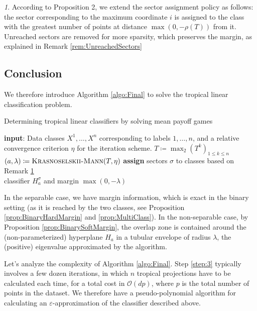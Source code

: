 \documentclass[oneside,UKenglish,a4paper]{amsart}
\numberwithin{equation}{section}
\numberwithin{figure}{section}
\theoremstyle{plain}
\theoremstyle{definition}
\theoremstyle{plain}
\theoremstyle{remark}
\newtheorem{rem}[thm]{\protect\remarkname}
\theoremstyle{plain}
\theoremstyle{definition}
\theoremstyle{definition}
\providecommand{\remarkname}{Remark}
\newcommand{\Input}{\textbf{input}}
\begin{document}
\begin{rem}\label{rem:SectorAssign}
According to Proposition 2, we extend the sector assignment policy as follows: the sector corresponding to the maximum coordinate $i$ is assigned to the class with the greatest number of points at distance $\max(0,-\rho(T))$ from it. Unreached sectors are removed for more sparsity, which preserves the margin, as explained in Remark \ref{rem:UnreachedSectors}
\end{rem}

\subsection*{Conclusion}

We therefore introduce Algorithm \ref{algo:Final} to solve the tropical linear classification problem.

\begin{algorithm}[h!]
\caption{Determining tropical linear classifiers by solving mean payoff games}
\label{algo:Final}
\begin{algorithmic}[1]
  \State \Input: Data classes $X^1,\ldots, X^n$ corresponding to labels $1, \ldots, n$, and a relative convergence criterion $\eta$ for the iteration scheme.
\State $T\coloneqq\max_2 \left(T^k\right)_{1\le k \le n}$
\State $(a,\lambda) \coloneqq \textsc{Krasnoselskii-Mann}(T, \eta)$ \label{step:3}
\State \textbf{assign} sectors $\sigma$ to classes based on Remark \ref{rem:SectorAssign}\\
\Return classifier $H_a^\sigma$ and margin $\max(0, -\lambda)$
\end{algorithmic}
\end{algorithm}

In the separable case, we have margin information, which is exact in the binary setting (as it is reached by the two classes, see Proposition \ref{prop:BinaryHardMargin} and \ref{prop:MultiClass}). In the non-separable case, by Proposition \ref{prop:BinarySoftMargin}, the overlap zone is contained around the (non-parameterized) hyperplane $H_a$ in a tubular envelope of radius $\lambda$, the (positive) eigenvalue approximated by the algorithm.

Let's analyze the complexity of Algorithm \ref{algo:Final}. Step \ref{step:3} typically involves a few dozen iterations, in which $n$ tropical projections have to be calculated each time, for a total cost in $\mathcal{O}(dp)$, where $p$ is the total number of points in the dataset. We therefore have a pseudo-polynomial algorithm for calculating an $\varepsilon$-approximation of the classifier described above.
\end{document}

